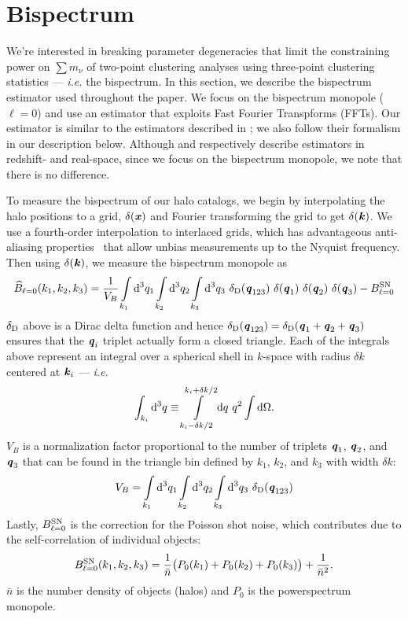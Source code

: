 \documentclass[12pt, letterpaper, preprint]{aastex62}
\newcommand{\smnu}{\sum m_\nu}
\newcommand{\bfi}[1]{\textbf{\textit{#1}}}
\newcommand{\beq}{\begin{equation}}
\newcommand{\eeq}{\end{equation}}
\begin{document}
\section{Bispectrum} \label{sec:bk} 
We're interested in breaking parameter degeneracies that limit the constraining 
power on $\smnu$ of two-point clustering analyses using three-point clustering 
statistics --- \emph{i.e.} the bispectrum. In this section, we describe the 
bispectrum estimator used throughout the paper. We focus on the bispectrum monopole 
($\ell = 0$) and use an estimator that exploits Fast Fourier Transpforms (FFTs). 
Our estimator is similar to the estimators described in \cite{scoccimarro2015,sefusatti2016}; 
we also follow their formalism in our description below. Although \cite{sefusatti2016} 
and \cite{scoccimarro2015} respectively describe estimators in redshift- and real-space,  
since we focus on the bispectrum monopole, we note that there is no difference. 

To measure the bispectrum of our halo catalogs, we begin by interpolating the halo
positions to a grid, $\delta({\bfi x})$ and Fourier transforming the grid to get $\delta({\bfi k})$.
We use a fourth-order interpolation to interlaced grids, which has advantageous 
anti-aliasing properties~\citep{hockney1981,sefusatti2016} that allow unbias measurements 
up to the Nyquist frequency. Then using $\delta({\bfi k})$, we measure the bispectrum monopole as 
\beq \label{eq:bk} 
\widehat{B}_{\ell = 0}(k_1,k_2, k_3) = \frac{1}{V_B} \int\limits_{k_1}{\rm d}^3q_1 \int\limits_{k_2}{\rm d}^3q_2 \int\limits_{k_3}{\rm d}^3q_3~\delta_{\rm D}({\bfi q_{123}})~\delta({\bfi q_1})~\delta({\bfi q_2})~\delta({\bfi q_3}) - B^{\rm SN}_{\ell = 0}
\eeq
$\delta_{\rm D}$ above is a Dirac delta function and hence $\delta_{\rm D}({\bfi q_{123}}) = \delta_{\rm D}({\bfi q_1} + {\bfi q_2} + {\bfi q_3})$ 
ensures that the ${\bfi q}_i$ triplet actually form a closed triangle. Each of the integrals 
above represent an integral over a spherical shell in $k$-space with radius $\delta k$ 
centered at ${\bfi k}_i$ --- \emph{i.e.} 
\beq
\int_{k_i}{\rm d}^3q \equiv \int\limits_{k_i-\delta k/2}^{k_i+\delta k/2}{\rm d}q~q^2\int {\rm d}\Omega.
\eeq
$V_B$ is a normalization factor proportional to the number of triplets ${\bfi q_1}$, 
${\bfi q_2}$, and ${\bfi q_3}$ that can be found in the triangle bin defined by 
$k_1$, $k_2$, and $k_3$ with width $\delta k$: 
\beq
V_B = \int\limits_{k_1}{\rm d}^3q_1 \int\limits_{k_2}{\rm d}^3q_2 \int\limits_{k_3}{\rm d}^3q_3~\delta_{\rm D}({\bfi q_{123}})
\eeq
Lastly, $B^{\rm SN}_{\ell=0}$ is the correction for the Poisson shot noise, which 
contributes due to the self-correlation of individual objects: 
\beq \label{eq:bk_sn} 
B^{\rm SN}_{\ell=0}(k_1, k_2, k_3) = \frac{1}{\bar{n}} \big(P_0(k_1) + P_0(k_2) + P_0(k_3) \big) + \frac{1}{\bar{n}^2}. 
\eeq
$\bar{n}$ is the number density of objects (halos) and $P_0$ is the powerspectrum monopole. 
\end{document}
